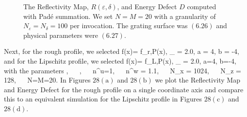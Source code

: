 \vspace{-38mm}
\begin{figure}[H]
    \centering
    \vspace{2mm}
    \caption{The Reflectivity Map, $R(\varepsilon,\delta)$, and Energy Defect $D$
    computed with Pad\'e summation. We set $N=M=20$ 
    with a granularity of $N_{\varepsilon}=N_{\delta}=100$ per invocation. The grating surface was $(6.26)$ and physical parameters were $(6.27)$.}
    \label{Fig:RM:Single Case 2}
\end{figure}
\vspace{-14mm}
\hspace{-6mm}Next, for the rough profile, we selected
\be
f(x)= f_{r,P}(x),
\quad
\varepsilon_{} = 2.0,
\quad
a = 4,
\quad
b = -4,
\ee
and for the Lipschitz profile, we selected
\be
f(x)= f_{L,P}(x),
\quad
\varepsilon_{} = 2.0,
\quad
a=4,
\quad
b=-4,
\ee
with the parameters
\be
{},
~~
,
~~
n^u=1,
~~
n^w = 1.1,
~~ N_x = 1024,
~~ N_z = 128,
~~
N=M=20.
\ee
In Figures $28(\text{a})$ and  $28(\text{b})$ we plot the Reflectivity Map and Energy Defect for the rough profile on a single coordinate axis and compare this to an equivalent simulation for the Lipschitz profile in Figures $28(\text{c})$ and  $28(\text{d})$.
